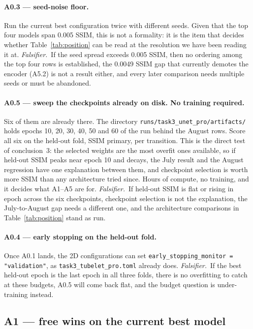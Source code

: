 \documentclass[11pt,a4paper]{article}
\newcommand{\fals}{\textit{Falsifier.}\ }
\begin{document}
\paragraph{A0.3 --- seed-noise floor.} Run the current best configuration twice with different seeds.
Given that the top four models span \num{0.005} SSIM, this is not a formality: it is the item that
decides whether Table~\ref{tab:position} can be read at the resolution we have been reading it at.
\fals If the seed spread exceeds \num{0.005} SSIM, then no ordering among the top four rows is
established, the \num{0.0049} SSIM gap that currently demotes the encoder (A5.2) is not a result either,
and every later comparison needs multiple seeds or must be abandoned.

\paragraph{A0.5 --- sweep the checkpoints already on disk. No training required.} Six of them are
already there. The directory \texttt{runs/task3\_unet\_pro/artifacts/} holds epochs 10, 20, 30, 40, 50
and 60 of the run behind the August rows. Score all six on the held-out fold, SSIM primary, per
transition. This is the direct test of
conclusion~3: the selected weights are the most overfit ones available, so if held-out SSIM peaks near
epoch 10 and decays, the July result and the August regression have one explanation between them, and
checkpoint selection is worth more SSIM than any architecture tried since. Hours of compute, no
training, and it decides what A1--A5 are for.
\fals If held-out SSIM is flat or rising in epoch across the six checkpoints, checkpoint selection is
not the explanation, the July-to-August gap needs a different one, and the architecture comparisons in
Table~\ref{tab:position} stand as run.

\paragraph{A0.4 --- early stopping on the held-out fold.} Once A0.1 lands, the 2D configurations can
set \texttt{early\_stopping\_monitor = "validation"}, as \texttt{task3\_tubelet\_pro.toml} already does.
\fals If the best held-out epoch is the last epoch in all three folds, there is no overfitting to catch
at these budgets, A0.5 will come back flat, and the budget question is under-training instead.

\subsection{A1 --- free wins on the current best model}
\label{sec:A1}
\end{document}
